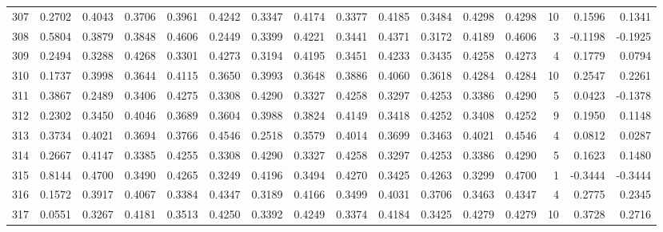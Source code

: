 \begin{tabular}{lrrrrrrrrrrrrrrr}
307 &      0.2702 &  0.4043 &  0.3706 &  0.3961 &  0.4242 &  0.3347 &  0.4174 &  0.3377 &  0.4185 &  0.3484 &   0.4298 &     0.4298 &     10 &                    0.1596 &                     0.1341 \\
308 &      0.5804 &  0.3879 &  0.3848 &  0.4606 &  0.2449 &  0.3399 &  0.4221 &  0.3441 &  0.4371 &  0.3172 &   0.4189 &     0.4606 &      3 &                   -0.1198 &                    -0.1925 \\
309 &      0.2494 &  0.3288 &  0.4268 &  0.3301 &  0.4273 &  0.3194 &  0.4195 &  0.3451 &  0.4233 &  0.3435 &   0.4258 &     0.4273 &      4 &                    0.1779 &                     0.0794 \\
310 &      0.1737 &  0.3998 &  0.3644 &  0.4115 &  0.3650 &  0.3993 &  0.3648 &  0.3886 &  0.4060 &  0.3618 &   0.4284 &     0.4284 &     10 &                    0.2547 &                     0.2261 \\
311 &      0.3867 &  0.2489 &  0.3406 &  0.4275 &  0.3308 &  0.4290 &  0.3327 &  0.4258 &  0.3297 &  0.4253 &   0.3386 &     0.4290 &      5 &                    0.0423 &                    -0.1378 \\
312 &      0.2302 &  0.3450 &  0.4046 &  0.3689 &  0.3604 &  0.3988 &  0.3824 &  0.4149 &  0.3418 &  0.4252 &   0.3408 &     0.4252 &      9 &                    0.1950 &                     0.1148 \\
313 &      0.3734 &  0.4021 &  0.3694 &  0.3766 &  0.4546 &  0.2518 &  0.3579 &  0.4014 &  0.3699 &  0.3463 &   0.4021 &     0.4546 &      4 &                    0.0812 &                     0.0287 \\
314 &      0.2667 &  0.4147 &  0.3385 &  0.4255 &  0.3308 &  0.4290 &  0.3327 &  0.4258 &  0.3297 &  0.4253 &   0.3386 &     0.4290 &      5 &                    0.1623 &                     0.1480 \\
315 &      0.8144 &  0.4700 &  0.3490 &  0.4265 &  0.3249 &  0.4196 &  0.3494 &  0.4270 &  0.3425 &  0.4263 &   0.3299 &     0.4700 &      1 &                   -0.3444 &                    -0.3444 \\
316 &      0.1572 &  0.3917 &  0.4067 &  0.3384 &  0.4347 &  0.3189 &  0.4166 &  0.3499 &  0.4031 &  0.3706 &   0.3463 &     0.4347 &      4 &                    0.2775 &                     0.2345 \\
317 &      0.0551 &  0.3267 &  0.4181 &  0.3513 &  0.4250 &  0.3392 &  0.4249 &  0.3374 &  0.4184 &  0.3425 &   0.4279 &     0.4279 &     10 &                    0.3728 &                     0.2716 \\

\end{tabular}
